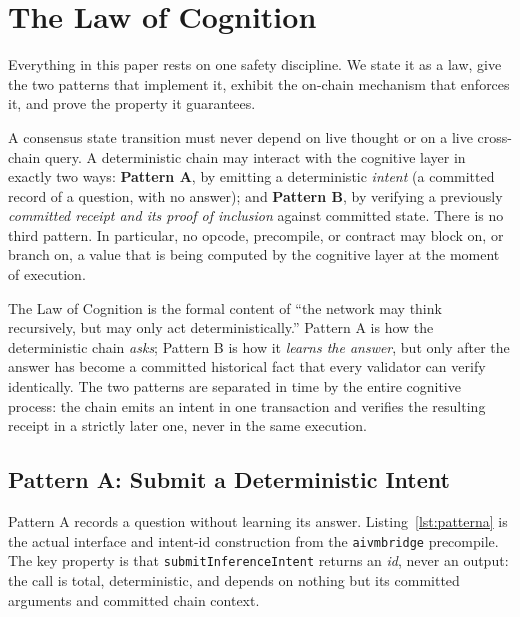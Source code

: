 \section{The Law of Cognition}
\label{sec:bridge}

Everything in this paper rests on one safety discipline. We state it as a law, give the two patterns that implement it, exhibit the on-chain mechanism that enforces it, and prove the property it guarantees.

\begin{principle}
\label{prin:bridge}
A consensus state transition must never depend on live thought or on a live cross-chain query. A deterministic chain may interact with the cognitive layer in exactly two ways: \textbf{Pattern A}, by emitting a deterministic \emph{intent} (a committed record of a question, with no answer); and \textbf{Pattern B}, by verifying a previously \emph{committed receipt and its proof of inclusion} against committed state. There is no third pattern. In particular, no opcode, precompile, or contract may block on, or branch on, a value that is being computed by the cognitive layer at the moment of execution.
\end{principle}

The Law of Cognition is the formal content of ``the network may think recursively, but may only act deterministically.'' Pattern A is how the deterministic chain \emph{asks}; Pattern B is how it \emph{learns the answer}, but only after the answer has become a committed historical fact that every validator can verify identically. The two patterns are separated in time by the entire cognitive process: the chain emits an intent in one transaction and verifies the resulting receipt in a strictly later one, never in the same execution.

\subsection{Pattern A: Submit a Deterministic Intent}

Pattern A records a question without learning its answer. Listing~\ref{lst:patterna} is the actual interface and intent-id construction from the \Lux{} \texttt{aivmbridge} precompile. The key property is that \texttt{submitInferenceIntent} returns an \emph{id}, never an output: the call is total, deterministic, and depends on nothing but its committed arguments and committed chain context.

